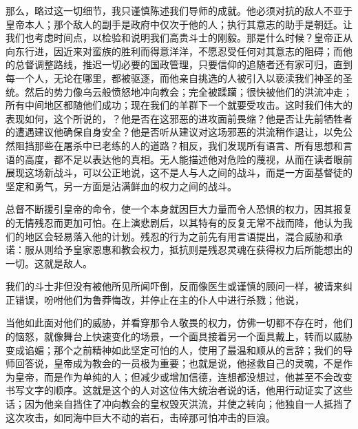 那么，略过这一切细节，我只谨慎陈述我们导师的成就。他必须对抗的敌人不亚于皇帝本人；那个敌人的副手是政府中仅次于他的人；执行其意志的助手是朝廷。让我们也考虑时间点，以检验和说明我们高贵斗士的刚毅。那是什么时候？皇帝正从向东行进，因近来对蛮族的胜利而得意洋洋，不愿忍受任何对其意志的阻碍；而他的总督调整路线，推迟一切必要的国政管理，只要信仰的追随者还有家可归，直到每一个人，无论在哪里，都被驱逐，而他亲自挑选的人被引入以亵渎我们神圣的圣统。然后的势力像乌云般愤怒地冲向教会；完全被蹂躏；很快被他们的洪流冲走；所有中间地区都随他们成功；现在我们的羊群下一个就要受攻击。这时我们伟大的表现如何，这个所说的，？他是否在这邪恶的进攻面前畏缩？他是否让先前牺牲者的遭遇建议他确保自身安全？他是否听从建议对这场邪恶的洪流稍作退让，以免公然阻挡那些在屠杀中已老练的人的道路？相反，我们发现所有语言、所有思想和言语的高度，都不足以表达他的真相。无人能描述他对危险的蔑视，从而在读者眼前展现这场新战斗，可以公正地说，这不是人与人之间的战斗，而是一方面基督徒的坚定和勇气，另一方面是沾满鲜血的权力之间的战斗。\par

总督不断援引皇帝的命令，使一个本身就因巨大力量而令人恐惧的权力，因其报复的无情残忍而更加可怕。在上演悲剧后，以其特有的反复无常不战而降，他认为我们的地区会轻易落入他的计划。残忍的行为之前先有用言语提出，混合威胁和承诺：服从则给予皇家恩惠和教会权力，抵抗则是残忍灵魂在获得权力后所能想出的一切。这就是敌人。\par

我们的斗士非但没有被他所见所闻吓倒，反而像医生或谨慎的顾问一样，被请来纠正错误，吩咐他们为鲁莽悔改，并停止在主的仆人中进行杀戮；他说，\par

当他如此面对他们的威胁，并看穿那令人敬畏的权力，仿佛一切都不存在时，他们的恼怒，就像舞台上快速变化的场景，一个面具接着另一个面具戴上，转而以威胁变成谄媚；那个之前精神如此坚定可怕的人，使用了最温和顺从的言辞；我们的导师回答说，皇帝成为教会的一员极为重要；也就是说，他拯救自己的灵魂，不是作为皇帝，而是作为单纯的人；但减少或增加信德，连想都没想过，他甚至不会改变书写文字的顺序。这就是这个的人对这位伟大统治者说的话，他用行动证实了这些话；因为他亲自挡住了冲向教会的皇权毁灭洪流，并使之转向；他独自一人抵挡了这次攻击，如同海中巨大不动的岩石，击碎那可怕冲击的巨浪。\par

